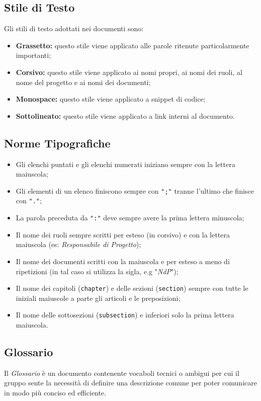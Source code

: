 \subsection{Stile di Testo}
Gli stili di testo adottati nei documenti sono:
\begin{itemize}
    \item \textbf{Grassetto:} questo stile viene applicato alle parole ritenute particolarmente importanti;
    \item \textbf{Corsivo:} questo stile viene applicato ai nomi propri, ai nomi dei ruoli, al nome del progetto e ai nomi dei documenti;
    \item \textbf{Monospace:} questo stile viene applicato a snippet di codice;
    \item \textbf{Sottolineato:} questo stile viene applicato a link interni al documento.
\end{itemize}
\subsection{Norme Tipografiche}
\begin{itemize}
    \item Gli elenchi puntati e gli elenchi numerati iniziano sempre con la lettera maiuscola;
    \item Gli elementi di un elenco finiscono sempre con \texttt{";"} tranne l'ultimo che finisce con \texttt{"."};
    \item La parola preceduta da \texttt{":"} deve sempre avere la prima lettera minuscola;
    \item Il nome dei ruoli sempre scritti per esteso (in corsivo) e con la lettera maiuscola (es: \textit{Responsabile di Progetto});
    \item Il nome dei documenti scritti con la maiuscola e per esteso a meno di ripetizioni (in tal caso si utilizza la sigla, e.g "\textit{NdP}");
    \item Il nome dei capitoli (\texttt{chapter}) e delle sezioni (\texttt{section}) sempre con tutte le iniziali maiuscole a parte gli articoli e le preposizioni;
    \item Il nome delle sottosezioni (\texttt{subsection}) e inferiori solo la prima lettera maiuscola.
\end{itemize}
\subsection{Glossario}
Il \textit{Glossario} è un documento contenente vocaboli tecnici o ambigui per cui il gruppo sente la necessità di definire una descrizione comune per poter comunicare in modo più conciso ed efficiente.

